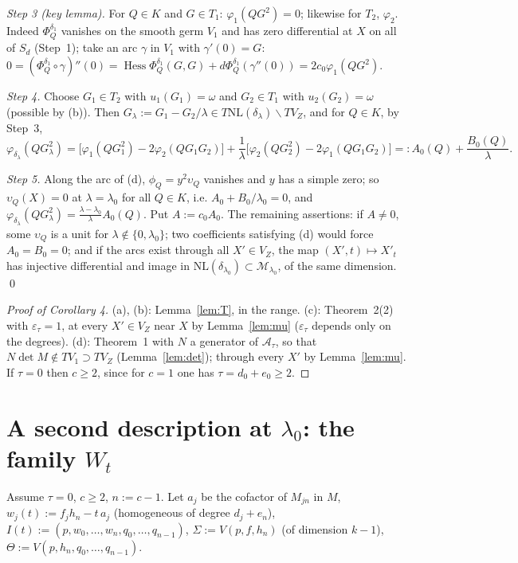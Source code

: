 \documentclass[11pt]{article}
\numberwithin{equation}{section}
\theoremstyle{remark}
\newcommand{\NL}{\mathrm{NL}}
\newcommand{\VZ}{V_Z}
\newcommand{\cM}{\mathcal{M}}
\newcommand{\cA}{\mathcal{A}}
\newcommand{\Hess}{\operatorname{Hess}}
\newcommand{\lz}{\lambda_0}
\newcommand{\et}{\varepsilon_\tau}
\begin{document}
\emph{Step 3 (key lemma).} For $Q\in K$ and $G\in T_1$: $\varphi_1(QG^2)=0$; likewise for $T_2$, $\varphi_2$.
Indeed $\Phi^{\delta_1}_Q$ vanishes on the smooth germ $V_1$ and has zero differential at $X$ on all of $S_d$
(Step~1); take an arc $\gamma$ in $V_1$ with $\gamma'(0)=G$: $0=(\Phi^{\delta_1}_Q\circ\gamma)''(0)=
\Hess\Phi^{\delta_1}_Q(G,G)+d\Phi^{\delta_1}_Q(\gamma''(0))=2c_0\varphi_1(QG^2)$.

\emph{Step 4.} Choose $G_1\in T_2$ with $u_1(G_1)=\omega$ and $G_2\in T_1$ with $u_2(G_2)=\omega$ (possible by
(b)). Then $G_\lambda:=G_1-G_2/\lambda\in T\NL(\delta_\lambda)\smallsetminus T\VZ$, and for $Q\in K$, by Step~3,
\[
\varphi_{\delta_\lambda}(QG_\lambda^2)=\bigl[\varphi_1(QG_1^2)-2\varphi_2(QG_1G_2)\bigr]
+\frac1\lambda\bigl[\varphi_2(QG_2^2)-2\varphi_1(QG_1G_2)\bigr]=:A_0(Q)+\frac{B_0(Q)}{\lambda}.
\]

\emph{Step 5.} Along the arc of (d), $\phi_Q=y^2\upsilon_Q$ vanishes and $y$ has a simple zero; so $\upsilon_Q(X)=0$ at
$\lambda=\lz$ for all $Q\in K$, i.e. $A_0+B_0/\lz=0$, and
$\varphi_{\delta_\lambda}(QG_\lambda^2)=\frac{\lambda-\lz}{\lambda}A_0(Q)$. Put $A:=c_0A_0$. The remaining
assertions: if $A\ne0$, some $\upsilon_Q$ is a unit for $\lambda\notin\{0,\lz\}$; two coefficients satisfying (d) would
force $A_0=B_0=0$; and if the arcs exist through all $X'\in\VZ$, the map $(X',t)\mapsto X'_t$ has injective
differential and image in $\NL(\delta_{\lz})\subset\cM_{\lz}$, of the same dimension. \qed

\begin{proof}[Proof of Corollary 4]
(a), (b): Lemma~\ref{lem:T}, in the range. (c): Theorem~2(2) with $\et=1$, at every $X'\in\VZ$ near $X$ by
Lemma~\ref{lem:mu} ($\et$ depends only on the degrees). (d): Theorem~1 with $N$ a generator of $\cA_\tau$, so
that $N\det M\notin T V_1\supset T\VZ$ (Lemma~\ref{lem:det}); through every $X'$ by Lemma~\ref{lem:mu}. If
$\tau=0$ then $c\ge2$, since for $c=1$ one has $\tau=d_0+e_0\ge2$.
\end{proof}

\section{A second description at \texorpdfstring{$\lz$}{lambda0}: the family \texorpdfstring{$W_t$}{Wt}}\label{sec:W}

Assume $\tau=0$, $c\ge2$, $n:=c-1$. Let $a_j$ be the cofactor of $M_{jn}$ in $M$,
$w_j(t):=f_jh_n-t\,a_j$ (homogeneous of degree $d_j+e_n$), $I(t):=(p,w_0,\dots,w_n,q_0,\dots,q_{n-1})$,
$\Sigma:=V(p,f,h_n)$ (of dimension $k-1$), $\Theta:=V(p,h_n,q_0,\dots,q_{n-1})$.
\end{document}

